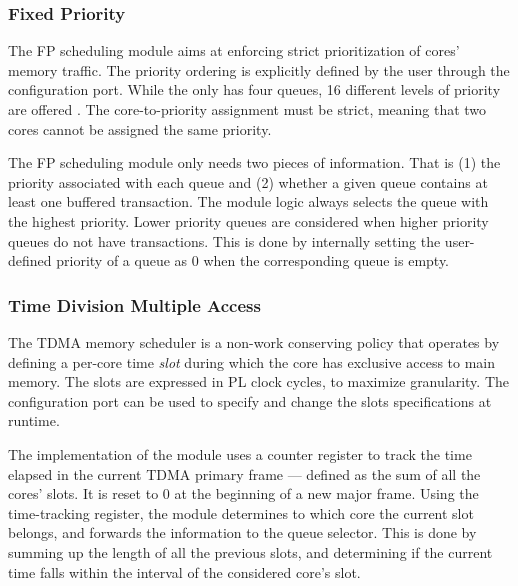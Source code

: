 \subsubsection{Fixed Priority}\label{sec:fixed_prio}
The FP scheduling module aims at enforcing strict prioritization of
cores' memory traffic. The priority ordering is explicitly defined by
the user through the configuration port. While the \schim
{} only has four queues, 16 different
levels of priority are offered . The core-to-priority assignment must
be strict, meaning that two cores cannot be assigned the same
priority.

The FP scheduling module only needs two pieces of information. That is
(1) the priority associated with each queue and (2) whether a given
queue contains at least one buffered transaction. The module logic
always selects the queue with the highest priority. Lower priority
queues are considered when higher priority queues do not have
transactions. This is done by internally setting the user-defined
priority of a queue as 0 when the corresponding queue is empty.

\subsubsection{Time Division Multiple Access}
The TDMA memory scheduler is a non-work conserving policy that
operates by defining a per-core time \emph{slot} during which the core
has exclusive access to main memory.  The slots are expressed in PL
clock cycles, to maximize granularity. The configuration port can be
used to specify and change the slots specifications at runtime.

The implementation of the module uses a counter register to track the
time elapsed in the current TDMA primary frame --- defined as the sum of
all the cores' slots. It is reset to 0 at the beginning of a new major
frame. Using the time-tracking register, the module determines to
which core the current slot belongs, and forwards the information to
the queue selector. This is done by summing up the length of all the
previous slots, and determining if the current time falls within the
interval of the considered core's slot.

\color{red}
